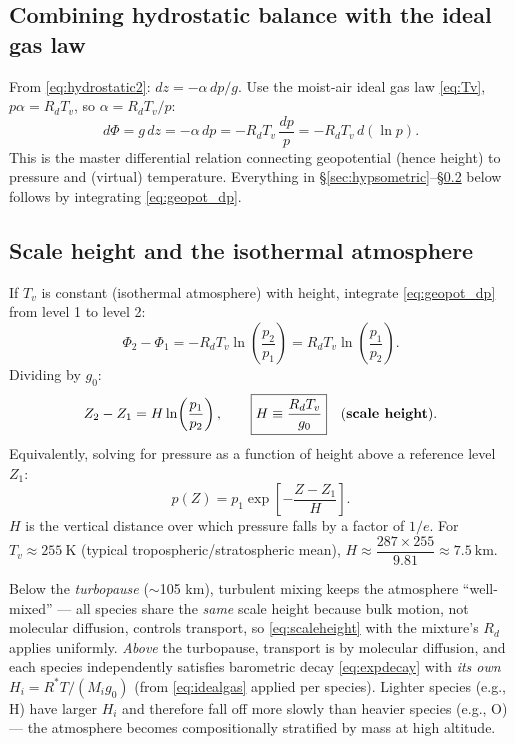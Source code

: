 \documentclass[11pt]{article}
\newcommand{\Rd}{R_d}
\begin{document}
\subsection{Combining hydrostatic balance with the ideal gas law}

From \eqref{eq:hydrostatic2}: $dz = -\alpha\,dp/g$. Use the moist-air ideal gas law \eqref{eq:Tv}, $p\alpha = \Rd T_v$, so $\alpha = \Rd T_v/p$:
\begin{equation}
d\Phi = g\,dz = -\alpha\,dp = -\Rd T_v\,\frac{dp}{p} = -\Rd T_v\, d(\ln p).
\label{eq:geopot_dp}
\end{equation}
This is the master differential relation connecting geopotential (hence height) to pressure and (virtual) temperature. Everything in \S\ref{sec:hypsometric}--\S\ref{sec:scaleheight} below follows by integrating \eqref{eq:geopot_dp}.

\subsection{Scale height and the isothermal atmosphere}
\label{sec:scaleheight}

If $T_v$ is constant (isothermal atmosphere) with height, integrate \eqref{eq:geopot_dp} from level 1 to level 2:
\begin{equation}
\Phi_2-\Phi_1 = -\Rd T_v \ln\!\left(\frac{p_2}{p_1}\right) = \Rd T_v\ln\!\left(\frac{p_1}{p_2}\right).
\end{equation}
Dividing by $g_0$:
\begin{equation}
Z_2-Z_1 = H\ln\!\left(\frac{p_1}{p_2}\right), \qquad \boxed{H \equiv \frac{\Rd T_v}{g_0}} \quad\text{(\textbf{scale height})}.
\label{eq:scaleheight}
\end{equation}
Equivalently, solving for pressure as a function of height above a reference level $Z_1$:
\begin{equation}
p(Z) = p_1\exp\!\left[-\frac{Z-Z_1}{H}\right].
\label{eq:expdecay}
\end{equation}
$H$ is the vertical distance over which pressure falls by a factor of $1/e$. For $T_v \approx 255\ \text{K}$ (typical tropospheric/stratospheric mean), $H\approx \dfrac{287\times255}{9.81}\approx 7.5\ \text{km}$.

\begin{defbox}
Below the \emph{turbopause} ($\sim$105 km), turbulent mixing keeps the atmosphere ``well-mixed'' — all species share the \emph{same} scale height because bulk motion, not molecular diffusion, controls transport, so \eqref{eq:scaleheight} with the mixture's $\Rd$ applies uniformly. \emph{Above} the turbopause, transport is by molecular diffusion, and each species independently satisfies barometric decay \eqref{eq:expdecay} with \emph{its own} $H_i = R^* T/(M_i g_0)$ (from \eqref{eq:idealgas} applied per species). Lighter species (e.g., H) have larger $H_i$ and therefore fall off more slowly than heavier species (e.g., O) — the atmosphere becomes compositionally stratified by mass at high altitude.
\end{defbox}
\end{document}
